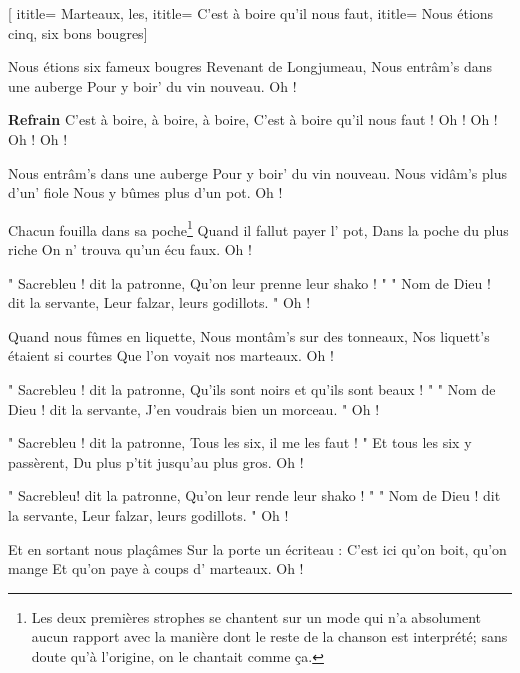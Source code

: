  [
ititle= {Marteaux, les},
ititle= {C'est à boire qu'il nous faut},
ititle= {Nous étions cinq, six bons bougres}]


\beginverse
Nous étions six fameux bougres
Revenant de Longjumeau,
Nous entrâm's dans une auberge
Pour y boir' du vin nouveau. Oh !
\endverse

\beginchorus
\textbf {Refrain}
C'est à boire, à boire, à boire,
C'est à boire qu'il nous faut !
Oh ! Oh ! Oh ! Oh !
\endchorus

\beginverse
Nous entrâm's dans une auberge
Pour y boir' du vin nouveau.
Nous vidâm's plus d'un' fiole
Nous y bûmes plus d'un pot. Oh !
\endverse

\beginverse
Chacun fouilla dans sa poche\footnote {Les deux premières strophes se chantent sur un mode qui n'a absolument aucun rapport avec la manière dont le reste de la chanson est interprété; sans doute qu'à l'origine, on le chantait comme ça.}
Quand il fallut payer l' pot,
Dans la poche du plus riche
On n' trouva qu'un écu faux. Oh !
\endverse

\beginverse
" Sacrebleu ! dit la patronne,
Qu'on leur prenne leur shako ! "
" Nom de Dieu ! dit la servante,
Leur falzar, leurs godillots. " Oh !
\endverse

\beginverse
Quand nous fûmes en liquette,
Nous montâm's sur des tonneaux,
Nos liquett's étaient si courtes
Que l'on voyait nos marteaux. Oh !
\endverse

\beginverse
" Sacrebleu ! dit la patronne,
Qu'ils sont noirs et qu'ils sont beaux ! "
" Nom de Dieu ! dit la servante,
J'en voudrais bien un morceau. " Oh !
\endverse

\beginverse
" Sacrebleu ! dit la patronne,
Tous les six, il me les faut ! "
Et tous les six y passèrent,
Du plus p'tit jusqu'au plus gros. Oh !
\endverse

\beginverse
" Sacrebleu! dit la patronne,
Qu'on leur rende leur shako ! "
" Nom de Dieu ! dit la servante,
Leur falzar, leurs godillots. " Oh !
\endverse

\beginverse
Et en sortant nous plaçâmes
Sur la porte un écriteau :
C'est ici qu'on boit, qu'on mange
Et qu'on paye à coups d' marteaux. Oh !
\endverse

\endsong